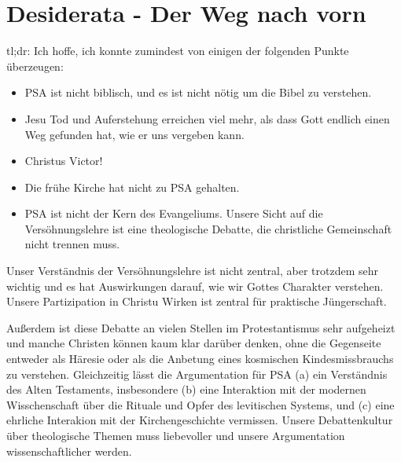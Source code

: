\documentclass[12pt]{report}
\begin{document}
\section{Desiderata - Der Weg nach vorn}
tl;dr:
Ich hoffe, ich konnte zumindest von einigen der folgenden Punkte überzeugen:
\begin{itemize}
	\item PSA ist nicht biblisch, und es ist nicht nötig um die Bibel zu verstehen.
	\item Jesu Tod und Auferstehung erreichen viel mehr, als dass Gott endlich einen Weg gefunden hat, wie er uns vergeben kann.
	\item Christus Victor!
	\item Die frühe Kirche hat nicht zu PSA gehalten.
	\item
		PSA ist nicht der Kern des Evangeliums.
		Unsere Sicht auf die Versöhnungslehre ist eine theologische Debatte, die christliche Gemeinschaft nicht trennen muss.
\end{itemize}

Unser Verständnis der Versöhnungslehre ist nicht zentral, aber trotzdem sehr wichtig und
es hat Auswirkungen darauf, wie wir Gottes Charakter verstehen.
Unsere Partizipation in Christu Wirken ist zentral für praktische Jüngerschaft.

Außerdem ist diese Debatte an vielen Stellen im Protestantismus sehr aufgeheizt und manche Christen können kaum klar darüber denken,
ohne die Gegenseite entweder als Häresie oder als die Anbetung eines kosmischen Kindesmissbrauchs zu verstehen.
Gleichzeitig lässt die Argumentation für PSA
(a) ein Verständnis des Alten Testaments, insbesondere
(b) eine Interaktion mit der modernen Wisschenschaft über die Rituale und Opfer des levitischen Systems, und
(c) eine ehrliche Interakion mit der Kirchengeschichte
vermissen.
Unsere Debattenkultur über theologische Themen muss liebevoller und unsere Argumentation wissenschaftlicher werden.

\appendix


\clearpage{\pagestyle{empty}\cleardoublepage}
\break
\renewcommand{\thepage}{}
\printbibliography
\printindex
\end{document}
